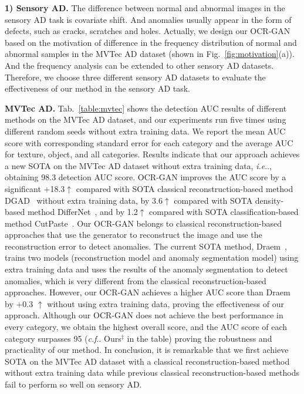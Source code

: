 \documentclass[lettersize,journal]{IEEEtran}
\makeatletter
\DeclareRobustCommand\onedot{\futurelet\@let@token\@onedot}
\def\@onedot{\ifx\@let@token.\else.\null\fi\xspace}
\def\ie{\emph{i.e}\onedot} \def\Ie{\emph{I.e}\onedot}
\def\cf{\emph{c.f}\onedot} \def\Cf{\emph{C.f}\onedot}
\makeatother
\begin{document}
\noindent\textbf{1) Sensory AD.} The difference between normal and abnormal images in the sensory AD task is covariate shift. And anomalies usually appear in the form of defects, such as cracks, scratches and holes. Actually, we design our OCR-GAN based on the motivation of difference in the frequency distribution of normal and abnormal samples in the MVTec AD dataset (shown in Fig.~\ref{fig:motivation}(a)). And the frequency analysis can be extended to other sensory AD datasets. Therefore, we choose three different sensory AD datasets to evaluate the effectiveness of our method in the sensory AD task.

\noindent\textbf{MVTec AD.} Tab.~\ref{table:mvtec} shows the detection AUC results of different methods on the MVTec AD dataset, and our experiments run five times using different random seeds without extra training data. We report the mean AUC score with corresponding standard error for each category and the average AUC for texture, object, and all categories. Results indicate that our approach achieves a new SOTA on the MVTec AD dataset without extra training data, \ie, obtaining 98.3 detection AUC score.
OCR-GAN improves the AUC score by a significant +18.3$\uparrow$ compared with SOTA classical reconstruction-based method DGAD~\cite{xia2021discriminative} without extra training data, by 3.6$\uparrow$ compared with SOTA density-based method DifferNet~\cite{rudolph2021same}, and by 1.2$\uparrow$ compared with SOTA classification-based method CutPaste~\cite{li2021cutpaste}. Our OCR-GAN belongs to classical reconstruction-based approaches that use the generator to reconstruct the image and use the reconstruction error to detect anomalies. The current SOTA method, Draem~\cite{zavrtanik2021draem}, trains two models (reconstruction model and anomaly segmentation model) using extra training data and uses the results of the anomaly segmentation to detect anomalies, which is very different from the classical reconstruction-based approaches. However, our OCR-GAN achieves a higher AUC score than Draem~\cite{zavrtanik2021draem} by +0.3 $\uparrow$ without using extra training data, proving the effectiveness of our approach. Although our OCR-GAN does not achieve the best performance in every category, we obtain the highest overall score, and the AUC score of each category surpasses 95 (\cf Ours$^{\ddag}$ in the table) proving the robustness and practicality of our method. In conclusion, it is remarkable that we first achieve SOTA on the MVTec AD dataset with a classical reconstruction-based method without extra training data while previous classical reconstruction-based methods fail to perform so well on sensory AD.
\end{document}
